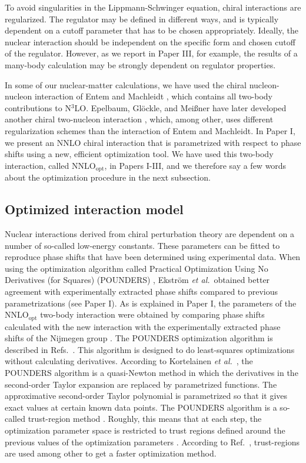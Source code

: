 \documentclass[a4paper,12pt]{report}
\begin{document}
To avoid singularities in the Lippmann-Schwinger equation,
chiral interactions are regularized. The regulator may be
defined in different ways, and is typically dependent on
a cutoff parameter that has to be chosen appropriately. 
Ideally, the nuclear interaction should be independent 
on the specific form and chosen cutoff of the regulator. 
However, as we report in Paper III, for example, the results 
of a many-body calculation may be strongly dependent on 
regulator properties.  

In some of our nuclear-matter calculations, 
we have used the chiral nucleon-nucleon interaction of 
Entem and Machleidt \cite{machleidt2003}, which contains 
all two-body contributions to N$^{3}$LO. Epelbaum,
Gl{\"o}ckle, and Mei{\ss}ner have later developed another
chiral two-nucleon interaction \cite{epelbaum2005}, which, 
among other, uses different regularization schemes than
the interaction of Entem and Machleidt. 
In Paper I, we present an NNLO chiral interaction that is
parametrized with respect to phase shifts using a new, 
efficient optimization tool. We have used this  
two-body interaction, called NNLO$_{\text{opt}}$, in 
Papers I-III, and we therefore say a few words about the
optimization procedure in the next subsection.   


\subsection{Optimized interaction model}

Nuclear interactions derived from chiral perturbation theory
are dependent on a number of so-called low-energy constants.
These parameters can be fitted to reproduce phase shifts
that have been determined using experimental data. When using 
the optimization algorithm called Practical Optimization Using 
No Derivatives (for Squares) (POUNDERS) 
\cite{kortelainen2010,munson2012}, Ekstr{\"o}m 
\emph{et al.}~obtained \cite{ekstrom2013} better agreement 
with experimentally extracted 
phase shifts compared to previous parametrizations (see Paper I).
As is explained in Paper I, the parameters of the 
NNLO$_{\text{opt}}$ two-body interaction were obtained 
by comparing phase shifts calculated with the new interaction
with the experimentally extracted phase shifts of the Nijmegen
group \cite{stoks1993}. The POUNDERS optimization algorithm
is described in Refs.~\cite{kortelainen2010,munson2012}.
This algorithm is designed to do least-squares optimizations
without calculating derivatives. According to Kortelainen
\emph{et al.}~\cite{kortelainen2010}, the POUNDERS algorithm
is a quasi-Newton method in which the derivatives in the 
second-order Taylor expansion are replaced by parametrized
functions. The approximative second-order Taylor polynomial 
is parametrized so that it gives exact values 
at certain known data points. The POUNDERS algorithm is a
so-called trust-region method \cite{cohn2009}. Roughly, this 
means that at each step, the optimization parameter space is 
restricted to trust regions defined around the previous 
values of the optimization parameters 
\cite{kortelainen2010,munson2012}.  
According to Ref.~\cite{cohn2009}, trust-regions are used 
among other to get a faster optimization method. 
\end{document}
